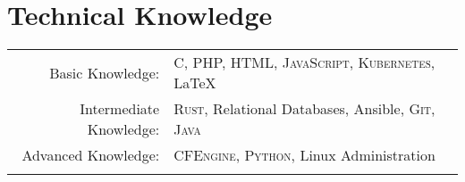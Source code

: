 \documentclass[letterpaper,10pt]{article}
\begin{document}
\pagestyle{plain}
\thispagestyle{fancy}


\section{Technical Knowledge}
\begin{tabular}{rl}
	Basic Knowledge:        & \textsc{C, PHP, HTML, JavaScript, Kubernetes}, \LaTeX            \\
	Intermediate Knowledge: & \textsc{Rust}, Relational Databases, Ansible, \textsc{Git, Java} \\
	Advanced Knowledge:     & \textsc{CFEngine, Python}, Linux Administration                  \\\\
\end{tabular}

\end{document}
